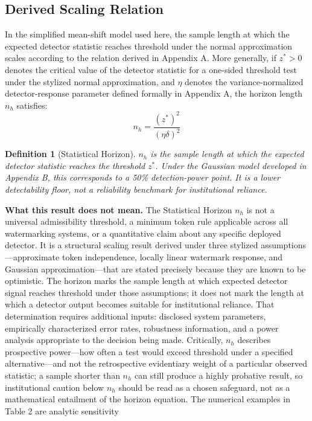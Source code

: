 \documentclass[11pt]{article}
\newtheorem{definition}{Definition}
\begin{document}
\subsection{Derived Scaling Relation}
In the simplified mean-shift model used here, the sample length at which the
expected detector statistic reaches threshold under the normal approximation scales
according to the relation derived in Appendix A. More generally, if $z^* > 0$
denotes the critical value of the detector statistic for a one-sided threshold test
under the stylized normal approximation, and $\eta$
denotes the variance-normalized detector-response parameter defined formally in
Appendix A, the horizon length $n_h$ satisfies:
\begin{equation}
n_h = \frac{(z^*)^2}{(\eta\delta)^2}
\end{equation}
\begin{definition}[Statistical Horizon]
$n_h$ is the sample length at which the expected detector statistic reaches the
threshold $z^*$. Under the Gaussian model developed in Appendix B, this
corresponds to a 50\% detection-power point. It is a lower detectability floor, not
a reliability benchmark for institutional reliance.
\end{definition}
\noindent\textbf{What this result does not mean.} The Statistical Horizon $n_h$ is
not a universal admissibility threshold, a minimum token rule applicable across all
watermarking systems, or a quantitative claim about any specific deployed detector.
It is a structural scaling result derived under three stylized
assumptions---approximate token independence, locally linear watermark response,
and Gaussian approximation---that are stated precisely because they are known to be
optimistic. The horizon marks the sample length at which expected detector signal
reaches threshold under those assumptions; it does not mark the length at which a
detector output becomes suitable for institutional reliance. That determination
requires additional inputs: disclosed system parameters, empirically characterized
error rates, robustness information, and a power analysis appropriate to the
decision being made. Critically, $n_h$ describes prospective power---how often a
test would exceed threshold under a specified alternative---and not the retrospective
evidentiary weight of a particular observed statistic; a sample shorter than $n_h$
can still produce a highly probative result, so institutional caution below $n_h$
should be read as a chosen safeguard, not as a mathematical entailment of the
horizon equation. The numerical examples in Table 2 are analytic sensitivity
\end{document}
